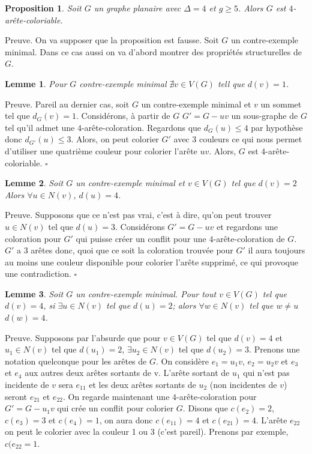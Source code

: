 \documentclass[10pt,a4paper]{article}
\newtheorem{proposition}{Proposition}
\newtheorem{lemme}{Lemme}
\newcommand{\ep}{{\hfill $\square$}}
\begin{document}

\begin{proposition}
Soit $G$ un graphe planaire avec $\Delta = 4$ et $g \geq 5$. Alors $G$ est $4$-arête-coloriable.
\end{proposition}

Preuve. On va supposer que la proposition est fausse. Soit $G$ un contre-exemple minimal. Dans ce cas aussi on va d'abord montrer des propriétés structurelles de $G$.

\begin{lemme}
Pour $G$ contre-exemple minimal $\nexists v \in V(G)$ tell que $d(v) = 1$.
\end{lemme}

Preuve.
Pareil au dernier cas, soit $G$ un contre-exemple minimal et $v$ un sommet tel que $d_G(v) = 1$. Considérons, à partir de $G$ $G' = G-uv$ un sous-graphe de $G$ tel qu'il admet une $4$-arête-coloration. Regardons que $d_G(u) \leq 4$ par hypothèse donc $d_{G'}(u) \leq 3$. Alors, on peut colorier $G'$ avec $3$ couleurs ce qui nous permet d'utiliser une quatrième couleur pour colorier l'arête $uv$. Alors, $G$ est $4$-arête-coloriable.
\ep

\begin{lemme}
Soit $G$ un contre-exemple minimal et $v \in V(G)$ tel que $d(v) = 2$ Alors $\forall u \in N(v)$, $d(u) = 4$.
\end{lemme} 

Preuve.
Supposons que ce n'est pas vrai, c'est à dire, qu'on peut trouver $u \in N(v)$ tel que $d(u) = 3$. Considérons $G' = G-uv$ et regardons une coloration pour $G'$ qui puisse créer un conflit pour une $4$-arête-coloration de $G$. $G'$ a 3 arêtes donc, quoi que ce soit la coloration trouvée pour $G'$ il aura toujours au moins une couleur disponible pour colorier l'arête supprimé, ce qui provoque une contradiction.
\ep

\begin{lemme}
Soit $G$ un contre-exemple minimal. Pour tout $v \in V(G)$ tel que $d(v) = 4$, si $\exists u \in N(v)$ tel que $d(u) = 2$; alors $\forall w \in N(v)$ tel que $w \neq u$ $d(w) = 4$.
\end{lemme}

Preuve.
Supposons par l'absurde que pour $v \in V(G)$ tel que $d(v) = 4$ et $u_1 \in N(v)$ tel que $d(u_1) = 2$, $\exists u_2 \in N(v)$ tel que $d(u_2) = 3$. Prenons une notation quelconque pour les arêtes de $G$. On considère $e_1 = u_1v$, $e_2 = u_2v$ et $e_3$ et $e_4$ aux autres deux arêtes sortants de v. L'arête sortant de $u_1$ qui n'est pas incidente de $v$ sera $e_{11}$ et les deux arêtes sortants de $u_2$ (non incidentes de $v$) seront $e_{21}$ et $e_{22}$. On regarde maintenant une $4$-arête-coloration pour $G' = G-u_1v$ qui crée un conflit pour colorier $G$. Disons que $c(e_2)=2$, $c(e_3)=3$ et $c(e_4)=1$, on aura donc $c(e_{11})=4$ et $c(e_{21})=4$. L'arête $e_{22}$ on peut le colorier avec la couleur 1 ou 3 (c'est pareil). Prenons par exemple, $c(e_{22} = 1$.
\end{document}
